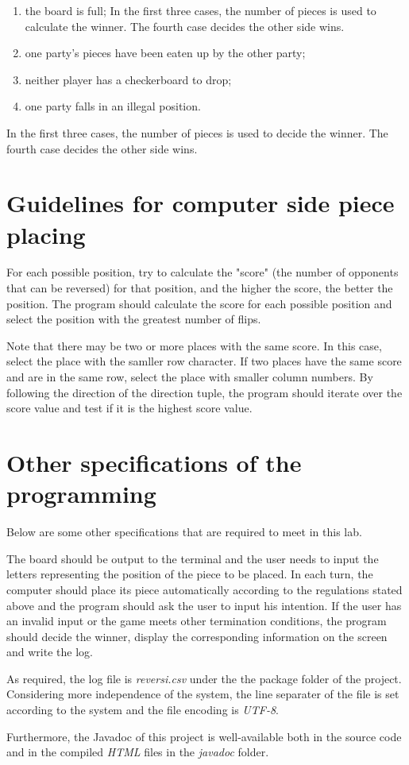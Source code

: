 \documentclass[a4paper]{report}
\begin{document}
\begin{enumerate}
\item the board is full; In the first three cases, the number of pieces is used to calculate the winner. The fourth case decides the other side wins.
\item one party's pieces have been eaten up by the other party; 
\item neither player has a checkerboard to drop;
\item one party falls in an illegal position.
\end{enumerate}
In the first three cases, the number of pieces is used to decide the winner. The fourth case decides the other side wins.
\section{Guidelines for computer side piece placing}
For each possible position, try to calculate the "score" (the number of opponents that can be reversed) for that position, and the higher the score, the better the position. The program should calculate the score for each possible position and select the position with the greatest number of flips. 
\par
Note that there may be two or more places with the same score. In this case, select the place with the samller row character. If two places have the same score and are in the same row, select the place with smaller column numbers. By following the direction of the direction tuple, the program should iterate over the score value and test if it is the highest score value.

\section{Other specifications of the programming}
Below are some other specifications that are required to meet in this lab.
\par
The board should be output to the terminal and the user needs to input the letters representing the position of the piece to be placed. In each turn, the computer should place its piece automatically according to the regulations stated above and the program should ask the user to input his intention. If the user has an invalid input or the game meets other termination conditions, the program should decide the winner, display the corresponding information on the screen and write the log.
\par
As required, the log file is \emph{reversi.csv} under the the package folder of the project. Considering more independence of the system, the line separater of the file is set according to the system and the file encoding is \emph{UTF-8}.
\par
Furthermore, the Javadoc of this project is well-available both in the source code and in the compiled \emph{HTML} files in the \emph{javadoc} folder.
\end{document}
